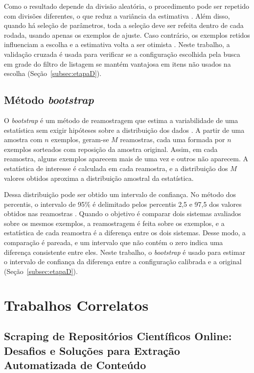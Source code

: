 Como o resultado depende da divisão aleatória, o procedimento pode ser repetido com divisões diferentes, o que reduz a variância da estimativa \cite{kohavi1995}. Além disso, quando há seleção de parâmetros, toda a seleção deve ser refeita dentro de cada rodada, usando apenas os exemplos de ajuste. Caso contrário, os exemplos retidos influenciam a escolha e a estimativa volta a ser otimista \cite{cawley2010}. Neste trabalho, a validação cruzada é usada para verificar se a configuração escolhida pela busca em grade do filtro de listagem se mantém vantajosa em itens não usados na escolha (Seção~\ref{subsec:etapaD}).

\subsection{Método \textit{bootstrap}}
\label{subsec:ref_bootstrap}

O \textit{bootstrap} é um método de reamostragem que estima a variabilidade de uma estatística sem exigir hipóteses sobre a distribuição dos dados \cite{efron1993}. A partir de uma amostra com $n$ exemplos, geram-se $M$ reamostras, cada uma formada por $n$ exemplos sorteados com reposição da amostra original. Assim, em cada reamostra, alguns exemplos aparecem mais de uma vez e outros não aparecem. A estatística de interesse é calculada em cada reamostra, e a distribuição dos $M$ valores obtidos aproxima a distribuição amostral da estatística.

Dessa distribuição pode ser obtido um intervalo de confiança. No método dos percentis, o intervalo de 95\% é delimitado pelos percentis 2,5 e 97,5 dos valores obtidos nas reamostras \cite{efron1993}. Quando o objetivo é comparar dois sistemas avaliados sobre os mesmos exemplos, a reamostragem é feita sobre os exemplos, e a estatística de cada reamostra é a diferença entre os dois sistemas. Desse modo, a comparação é pareada, e um intervalo que não contém o zero indica uma diferença consistente entre eles. Neste trabalho, o \textit{bootstrap} é usado para estimar o intervalo de confiança da diferença entre a configuração calibrada e a original (Seção~\ref{subsec:etapaD}).

\section{Trabalhos Correlatos}

\subsection{Scraping de Repositórios Científicos Online: Desafios e Soluções para Extração Automatizada de Conteúdo}

